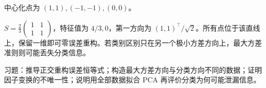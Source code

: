 \begin{example}[一个主方向]
中心化点为 $(1,1),(-1,-1),(0,0)$。
\end{example}
\begin{solve}
$S=\frac23\left(\begin{smallmatrix}1&1\\1&1\end{smallmatrix}\right)$，特征值为 $4/3,0$，第一方向为 $(1,1)^\top/\sqrt2$。所有点位于该直线上，保留一维即可零误差重构。若类别区别只在另一个极小方差方向上，最大方差准则则可能丢失分类信息。
\end{solve}

习题：推导正交重构误差恒等式；构造最大方差方向与分类方向不同的数据；证明因子变换的不唯一性；说明用全部数据拟合 PCA 再评价分类为何可能泄漏信息。





